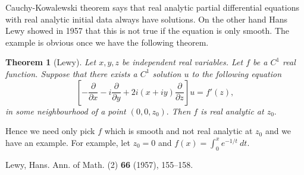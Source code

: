 \documentclass[12pt]{article}
\theoremstyle{theorem}
\newtheorem*{thm}{Theorem}
\theoremstyle{definition}
\theoremstyle{remark}
\begin{document}
Cauchy-Kowalewski theorem says that real analytic partial differential equations with real analytic initial data always have solutions.  On the other hand Hans Lewy showed in 1957 that this is not true if the equation is only smooth.  The example is obvious once we have the following theorem.

\begin{thm}[Lewy]
Let $x,y,z$ be independent real variables.  Let $f$ be a $C^1$ real function. 
Suppose that there exists a $C^1$ solution $u$ to the following equation
\begin{equation*}
\left[
- \frac{\partial}{\partial x}
- i \frac{\partial}{\partial y}
+ 2i(x + i y) \frac{\partial}{\partial z}
\right] u
= f'(z) ,
\end{equation*}
in some neighbourhood of a point $(0,0,z_0).$
Then $f$ is real analytic at $z_0.$
\end{thm}

Hence we need only pick $f$ which is smooth and not real analytic at $z_0$ and we have an example.  For example,
let $z_0 = 0$ and $f(x) = \int_0^x e^{-1/t} ~ dt.$


\begin{thebibliography}{9}
Lewy, Hans.
{\it {}}
Ann. of Math. (2) {\bf 66} (1957), 155--158. 
\end{thebibliography}


\end{document}
